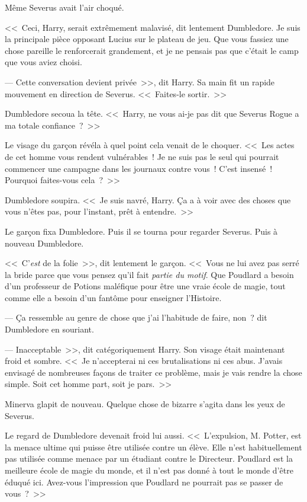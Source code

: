 Même Severus avait l'air choqué.

<<~Ceci, Harry, serait extrêmement malavisé, dit lentement Dumbledore. Je suis la principale pièce opposant Lucius sur le plateau de jeu. Que vous fassiez une chose pareille le renforcerait grandement, et je ne pensais pas que c'était le camp que vous aviez choisi.

--- Cette conversation devient privée~>>, dit Harry. Sa main fit un rapide mouvement en direction de Severus. <<~Faites-le sortir.~>>

Dumbledore secoua la tête. <<~Harry, ne vous ai-je pas dit que Severus Rogue a ma totale confiance~?~>>

Le visage du garçon révéla à quel point cela venait de le choquer. <<~Les actes de cet homme vous rendent vulnérables~! Je ne suis pas le seul qui pourrait commencer une campagne dans les journaux contre vous~! C'est insensé~! Pourquoi faites-vous cela~?~>>

Dumbledore soupira. <<~Je suis navré, Harry. Ça a à voir avec des choses que vous n'êtes pas, pour l'instant, prêt à entendre.~>>

Le garçon fixa Dumbledore. Puis il se tourna pour regarder Severus. Puis à nouveau Dumbledore.

<<~C'\emph{est} de la folie~>>, dit lentement le garçon. <<~Vous ne lui avez pas serré la bride parce que vous pensez qu'il fait \emph{partie du motif}. Que Poudlard a besoin d'un professeur de Potions maléfique pour être une vraie école de magie, tout comme elle a besoin d'un fantôme pour enseigner l'Histoire.

--- Ça ressemble au genre de chose que j'ai l'habitude de faire, non~? dit Dumbledore en souriant.

--- Inacceptable~>>, dit catégoriquement Harry. Son visage était maintenant froid et sombre. <<~Je n'accepterai ni ces brutalisations ni ces abus. J'avais envisagé de nombreuses façons de traiter ce problème, mais je vais rendre la chose simple. Soit cet homme part, soit je pars.~>>

Minerva glapit de nouveau. Quelque chose de bizarre s'agita dans les yeux de Severus.

Le regard de Dumbledore devenait froid lui aussi. <<~L'expulsion, M. Potter, est la menace ultime qui puisse être utilisée contre un élève. Elle n'est habituellement pas utilisée comme menace par un étudiant contre le Directeur. Poudlard est la meilleure école de magie du monde, et il n'est pas donné à tout le monde d'être éduqué ici. Avez-vous l'impression que Poudlard ne pourrait pas se passer de vous~?~>>

